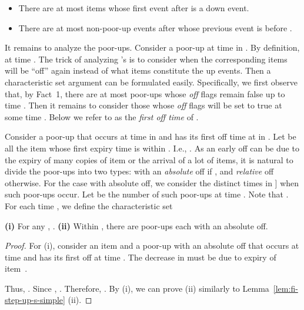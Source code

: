 \documentclass[proceedings]{stacs}
\theoremstyle{definition}\newtheorem{fact}{Fact}
\begin{document}
\vspace{.5ex}
\begin{itemize}
\item
There are at most  items
whose first event after  is a down event.
\vspace{.5ex}
\item
There are at most  non-poor-up
events after  whose previous event is before .
\end{itemize}
\vspace{.5ex}

It remains to analyze the poor-ups.
Consider a poor-up  at time  in .
By definition,  at time .
The trick of analyzing 's
is to consider when the corresponding
items will be ``off'' again instead
of what items constitute the up events.
Then a characteristic
set argument can be formulated easily.
Specifically, we first observe that,
by Fact~1, there are at most  poor-ups
whose {\em off}\/ flags remain false up to time .
Then it remains to consider those 
whose {\em off}\/ flags will be set to true at some time .
Below we refer to  as the \emph{first off time} of .



\vspace{.5ex}
Consider a poor-up  that occurs at time  in 
and has its first off time at  in .
Let  be all the item  whose first expiry time is
within .  I.e.,  .
As an early off can be due to the expiry of many copies of item 
or the arrival of a lot of items, it is natural to divide
the poor-ups into two types:  with an \emph{absolute} off if
, and \emph{relative} off otherwise.
For the case with absolute off, we consider
the distinct times  in ]
when such poor-ups occur.
Let  be the number of such poor-ups at time .
Note that .
For each time ,
we define the characteristic set


\begin{lemma} \label{lem:fi-poor-up-s}
{\bf (i)}
For any , .
{\bf (ii)}
Within , there are 
poor-ups each with an absolute off.
\end{lemma}

\begin{proof}
For (i),
consider an item  and a poor-up  with an absolute off that occurs at time 
and has its first off at time .
The decrease in  must be due to expiry of item~.

Thus,
.
Since ,
. Therefore,
.
By (i), we can prove (ii) similarly to Lemma~\ref{lem:fi-step-up-s-simple} (ii).
\end{proof}
\end{document}
